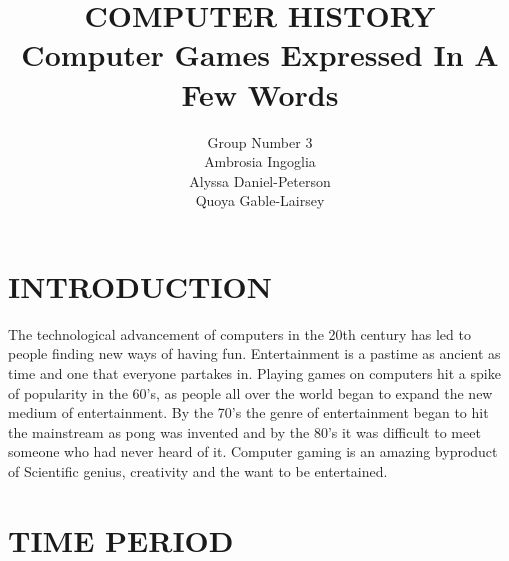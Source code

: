 \documentclass[letterpaper, 10 pt, conference]{IEEEconf}
\title{\LARGE \bf
COMPUTER HISTORY\\
\large Computer Games Expressed In A Few Words
}
\author{Group Number 3\\
\small Ambrosia Ingoglia\\
\small Alyssa Daniel-Peterson\\
\small Quoya Gable-Lairsey\\
}
\begin{document}
\maketitle
\thispagestyle{empty}
\pagestyle{empty}

\section{INTRODUCTION}

The technological advancement of computers in the 20th century has led to people finding new ways of having fun. Entertainment is a pastime as ancient as time and one  that everyone partakes in. Playing games on computers hit a spike of popularity in the 60’s, as people all over the world began to expand the new medium of entertainment. By the 70’s the genre of entertainment began to hit the mainstream as pong was invented and by the 80’s it was difficult to meet someone who had never heard of it. Computer gaming is an amazing byproduct of Scientific genius, creativity and the want to be entertained.


\section{TIME PERIOD}
\end{document}
